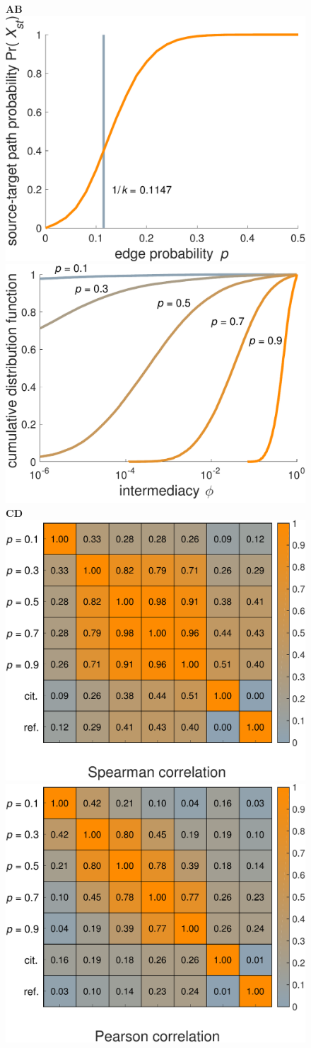 \documentclass[9pt,twocolumn,twoside,lineno]{pnas-alt}
\theoremstyle{definition}
\begin{document}
\begin{sansmath}\begin{figure}
  \centering%
  \begin{minipage}{7.4cm}
  	\hskip8pt\textbf{\textsf{\footnotesize A}}\hskip104pt\textbf{\textsf{\footnotesize B}}\\\vskip-8pt%
    \includegraphics[width=0.45\linewidth]{phist_Q}\linewidth
    \includegraphics[width=0.45\linewidth]{distributions_Q}\\\vskip-12pt\hskip8pt\textbf{\textsf{\footnotesize C}}\hskip104pt\textbf{\textsf{\footnotesize D}}\\\vskip-6pt%
    \includegraphics[width=0.466\linewidth]{spearman_Q}\linewidth
    \includegraphics[width=0.466\linewidth]{pearson_Q}%

\end{minipage}
\end{figure}
\end{sansmath}
\end{document}
